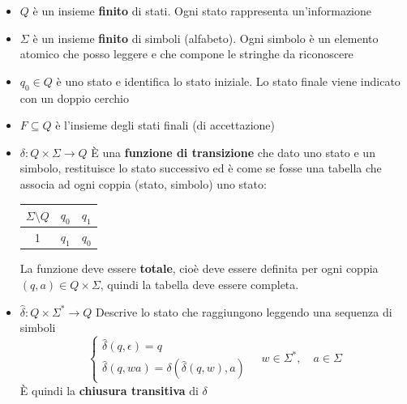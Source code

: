 \documentclass[a4paper]{article}
\begin{document}
\begin{itemize}
  \item \( Q \) è un insieme \textbf{finito} di stati. Ogni stato rappresenta
    un'informazione

  \item \( \Sigma  \) è un insieme \textbf{finito} di simboli (alfabeto).
    Ogni simbolo è un elemento atomico che posso leggere e che compone le
    stringhe da riconoscere
    
  \item \( q_0 \in Q \) è uno stato e identifica lo stato iniziale. Lo stato finale
    viene indicato con un doppio cerchio

  \item \( F \subseteq Q \) è l'insieme degli stati finali (di accettazione)

  \item \( \delta: Q \times \Sigma \to Q \) È una \textbf{funzione di transizione}
    che dato uno stato e un simbolo, restituisce lo stato successivo ed è come se
    fosse una tabella che associa ad ogni coppia (stato, simbolo) uno stato:
    \begin{table}[H]
      \centering
      \begin{tabular}{|c|c|c|}
        \hline
        \( \Sigma \setminus Q\) & \( q_0 \) & \( q_1 \)\\
        \hline
        1 & \( q_1 \) & \( q_0 \)\\
        \hline
      \end{tabular}
    \end{table}
    La funzione deve essere \textbf{totale}, cioè deve essere definita per ogni
    coppia \( (q,a) \in Q \times \Sigma  \), quindi la tabella deve essere completa.

  \item \( \hat{\delta}: Q \times \Sigma^* \to Q \) Descrive lo stato che raggiungono
    leggendo una sequenza di simboli
    \[
      \begin{cases}
        \hat{\delta}(q, \epsilon) = q\\
        \hat{\delta}(q, wa) = \delta(\hat{\delta}(q,w), a)
      \end{cases}
      \quad
      w \in \Sigma^*, \quad a \in \Sigma 
    \] 
    È quindi la \textbf{chiusura transitiva} di \( \delta \)
\end{itemize}
\end{document}
